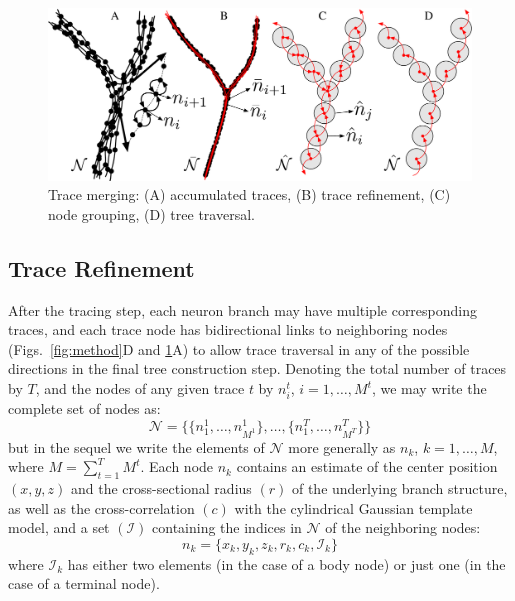 \begin{figure}%
	\centering
	\includegraphics[width=0.7\columnwidth]{fig4}
	\caption{Trace merging: (A) accumulated traces, (B) trace refinement, (C) node grouping, (D) tree traversal.}
	\label{fig4}
\end{figure}

\subsection{Trace Refinement}
\label{subsec:trace-refinement}
After the tracing step, each neuron branch may have multiple corresponding traces, and each trace node has bidirectional links to neighboring nodes (Figs.~\ref{fig:method}D and \ref{fig4}A) to allow trace traversal in any of the possible directions in the final tree construction step. Denoting the total number of traces by $T$, and the nodes of any given trace $t$ by $n_i^t$, $i=1,\dots,M^t$, we may write the complete set of nodes as:
\begin{equation}
\label{eq:N}
\mathcal{N} = \bigg\{
\Big\{ n_1^1,\dots,n_{M^1}^1\Big\},
\dots,
\Big\{ n_1^T,\dots,n_{M^T}^T\Big\}
\bigg\}
\end{equation}
but in the sequel we write the elements of $\mathcal{N}$ more generally as $n_k$, $k=1,\dots,M$, where $M=\sum_{t=1}^{T}M^t$. Each node $n_k$ contains an estimate of the center position $\left(x,y,z\right)$ and the cross-sectional radius $\left(r\right)$ of the underlying branch structure, as well as the cross-correlation $\left(c\right)$ with the cylindrical Gaussian template model, and a set $\left( \mathcal{I} \right)$ containing the indices in $\mathcal{N}$ of the neighboring nodes:
\begin{equation}
\label{eq:n_k}
n_k = \lbrace x_k, y_k, z_k, r_k, c_k, \mathcal{I}_k \rbrace
\end{equation}
where $\mathcal{I}_k$ has either two elements (in the case of a body node) or just one (in the case of a terminal node).

